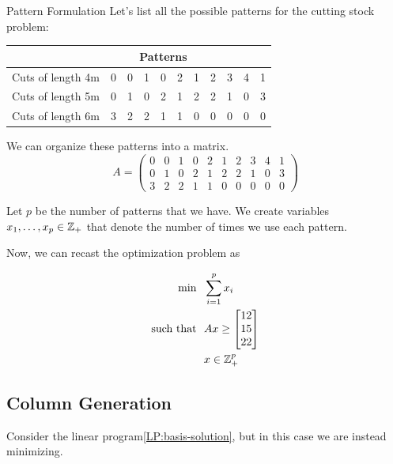 \begin{example}{Pattern Formulation}{}
Let's list all the possible patterns for the cutting stock problem:

\begin{center}
\begin{tabular}{l|c|c|c|c|c|c|c|c|c|c}
& \multicolumn{7}{c}{Patterns}\\
\hline
Cuts of length 4m &0 &0 &1 &0 &2 &1 &2 &3 &4 & 1\\
 Cuts of length 5m   &    0 &1 &0 &2 &1 &2& 2& 1 &0&3 \\
 Cuts of length 6m   &    3& 2 &2 &1 &1 &0& 0& 0 &0 &0\\
 \hline
\end{tabular}
\end{center}

We can organize these patterns into a matrix.
\begin{equation}
A = 
\begin{pmatrix}
0 &0 &1 &0 &2 &1 &2 &3 &4 & 1\\
        0 &1 &0 &2 &1 &2& 2& 1 &0&3 \\
        3& 2 &2 &1 &1 &0& 0& 0 &0 &0
\end{pmatrix}
 \end{equation}
 
 Let $p$ be the number of patterns that we have.  We  create variables $x_1, \dots, x_p \in {\mathbb{Z}}_+$ that denote the number of times we use each pattern.

Now, we can recast the optimization problem as

\begin{align}
\min \ \ & \sum_{i=1}^p x_i \\
\mbox{such that} \ \ & Ax \geq \begin{bmatrix} 12 \\ 15 \\ 22\end{bmatrix}\\
& x \in {\mathbb{Z}}^p_+
\end{align}
 
\end{example}



\subsection{Column Generation}
Consider the linear program\eqref{LP:basis-solution}, but in this case we are instead minimizing.  


